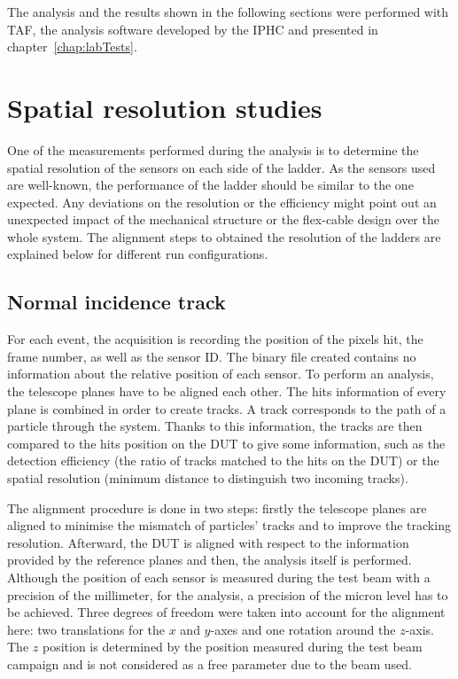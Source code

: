    The analysis and the results shown in the following sections were performed with \gls{TAF}, the analysis software developed by the \gls{IPHC} and presented in chapter~\ref{chap:labTests}.

  \section{Spatial resolution studies}
   
    One of the measurements performed during the analysis is to determine the spatial resolution of the sensors on each side of the ladder.
    As the sensors used are well-known, the performance of the ladder should be similar to the one expected.
    Any deviations on the resolution or the efficiency might point out an unexpected impact of the mechanical structure or the flex-cable design over the whole system.
    The alignment steps to obtained the resolution of the ladders are explained below for different run configurations. 

    \subsection{Normal incidence track}
     
    For each event, the acquisition is recording the position of the pixels hit, the frame number, as well as the sensor ID.
    The binary file created contains no information about the relative position of each sensor.
    To perform an analysis, the telescope planes have to be aligned each other.
    The hits information of every plane is combined in order to create tracks. 
    A track corresponds to the path of a particle through the system.
    Thanks to this information, the tracks are then compared to the hits position on the \gls{DUT} to give some information, such as the detection efficiency (the ratio of tracks matched to the hits on the \gls{DUT}) or the spatial resolution (minimum distance to distinguish two incoming tracks).

    The alignment procedure is done in two steps: firstly the telescope planes are aligned to minimise the mismatch of particles' tracks and to improve the tracking resolution.
    Afterward, the \gls{DUT} is aligned with respect to the information provided by the reference planes and then, the analysis itself is performed.
    Although the position of each sensor is measured during the test beam with a precision of the millimeter, for the analysis, a precision of the micron level has to be achieved.
    Three degrees of freedom were taken into account for the alignment here: two translations for the $x$ and $y$-axes and one rotation around the $z$-axis.
    The $z$ position is determined by the position measured during the test beam campaign and is not considered as a free parameter due to the beam used.


